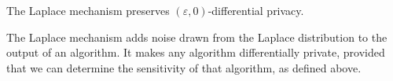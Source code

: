 \begin{theorem}
The Laplace mechanism preserves $(\varepsilon, 0)$-differential privacy.
\end{theorem}

The Laplace mechanism adds noise drawn from the Laplace distribution to the output of an algorithm. It makes any algorithm differentially private, provided that we can determine the sensitivity of that algorithm, as defined above.
